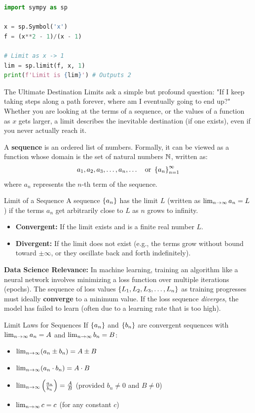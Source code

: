 \begin{lstlisting}[language=Python, caption=Data Science: Calculating Limits and Derivatives]
import sympy as sp

x = sp.Symbol('x')
f = (x**2 - 1)/(x - 1)

# Limit as x -> 1
lim = sp.limit(f, x, 1)
print(f'Limit is {lim}') # Outputs 2
\end{lstlisting}


\begin{intuitionbox}{The Ultimate Destination}
Limits ask a simple but profound question: "If I keep taking steps along a path forever, where am I eventually going to end up?" Whether you are looking at the terms of a sequence, or the values of a function as $x$ gets larger, a limit describes the inevitable destination (if one exists), even if you never actually reach it.
\end{intuitionbox}

A \textbf{sequence} is an ordered list of numbers. Formally, it can be viewed as a function whose domain is the set of natural numbers $\mathbb{N}$, written as:
$$a_1, a_2, a_3, \dots, a_n, \dots \quad \text{or } \left\{a_n\right\}_{n=1}^{\infty}$$
where $a_n$ represents the $n$-th term of the sequence.

\begin{definitionbox}{Limit of a Sequence}
A sequence $\left\{a_n\right\}$ has the limit $L$ (written as $\lim_{n \to \infty} a_n = L$) if the terms $a_n$ get arbitrarily close to $L$ as $n$ grows to infinity.
\begin{itemize}
    \item \textbf{Convergent:} If the limit exists and is a finite real number $L$.
    \item \textbf{Divergent:} If the limit does not exist (e.g., the terms grow without bound toward $\pm\infty$, or they oscillate back and forth indefinitely).
\end{itemize}
\end{definitionbox}

\textbf{Data Science Relevance:} In machine learning, training an algorithm like a neural network involves minimizing a loss function over multiple iterations (epochs). The sequence of loss values $\left\{L_1, L_2, L_3, \dots, L_n\right\}$ as training progresses must ideally \textbf{converge} to a minimum value. If the loss sequence \textit{diverges}, the model has failed to learn (often due to a learning rate that is too high).

\begin{theorembox}{Limit Laws for Sequences}
If $\left\{a_n\right\}$ and $\left\{b_n\right\}$ are convergent sequences with $\lim_{n \to \infty} a_n = A$ and $\lim_{n \to \infty} b_n = B$:
\begin{itemize}
    \item $\lim_{n \to \infty} (a_n \pm b_n) = A \pm B$
    \item $\lim_{n \to \infty} (a_n \cdot b_n) = A \cdot B$
    \item $\lim_{n \to \infty} \left(\frac{a_n}{b_n}\right) = \frac{A}{B}$ (provided $b_n \neq 0$ and $B \neq 0$)
    \item $\lim_{n \to \infty} c = c$ (for any constant $c$)
\end{itemize}
\end{theorembox}

